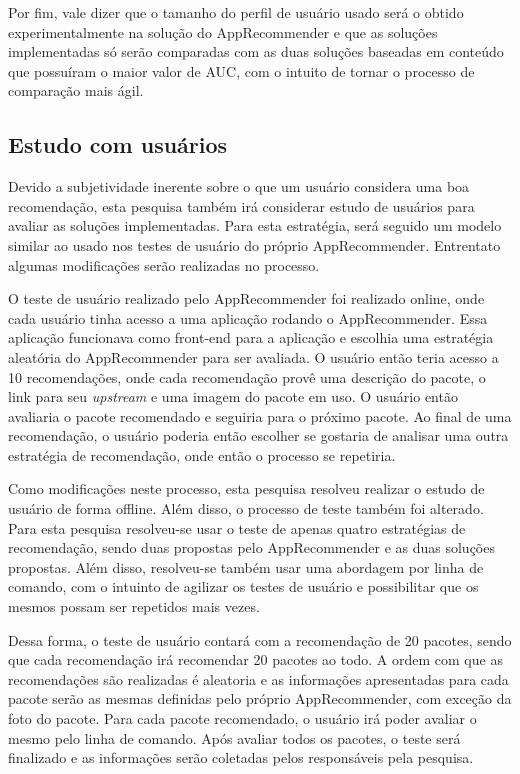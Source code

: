 Por fim, vale dizer que o tamanho do perfil de usuário usado será o obtido
experimentalmente na solução do AppRecommender e que as soluções implementadas
só serão comparadas com as duas soluções baseadas em conteúdo que possuíram o
maior valor de AUC, com o intuito de tornar o processo de comparação mais ágil.

\subsection{Estudo com usuários}

Devido a subjetividade inerente sobre o que um usuário considera uma boa
recomendação, esta pesquisa também irá considerar estudo de usuários para
avaliar as soluções implementadas. Para esta estratégia, será seguido um modelo
similar ao usado nos testes de usuário do próprio AppRecommender. Entrentato
algumas modificações serão realizadas no processo.

O teste de usuário realizado pelo AppRecommender foi realizado online, onde cada
usuário tinha acesso a uma aplicação rodando o AppRecommender. Essa aplicação
funcionava como front-end para a aplicação e escolhia uma estratégia aleatória
do AppRecommender para ser avaliada. O usuário então teria acesso a 10
recomendações, onde cada recomendação provê uma descrição do
pacote, o link para seu \textit{upstream} e uma imagem do pacote em uso. O
usuário então avaliaria o pacote recomendado e seguiria para o próximo pacote.
Ao final de uma recomendação, o usuário poderia então escolher se gostaria de
analisar uma outra estratégia de recomendação, onde então o processo se
repetiria.

Como modificações neste processo, esta pesquisa resolveu realizar o estudo de
usuário de forma offline. Além disso, o processo de teste também foi alterado.
Para esta pesquisa resolveu-se usar o teste de apenas quatro estratégias de
recomendação, sendo duas propostas pelo AppRecommender e as duas soluções
propostas. Além disso, resolveu-se também usar uma abordagem por linha de
comando, com o intuinto de agilizar os testes de usuário e possibilitar que os
mesmos possam ser repetidos mais vezes.

Dessa forma, o teste de usuário contará com a recomendação de 20 pacotes,
sendo que cada recomendação irá recomendar 20 pacotes ao todo. A ordem com que
as recomendações são realizadas é aleatoria e as informações apresentadas
para cada pacote serão as mesmas definidas pelo próprio AppRecommender, com
exceção da foto do pacote. Para cada pacote recomendado, o usuário irá poder
avaliar o mesmo pelo linha de comando. Após avaliar todos os pacotes, o teste
será finalizado e as informações serão coletadas pelos responsáveis pela
pesquisa.

